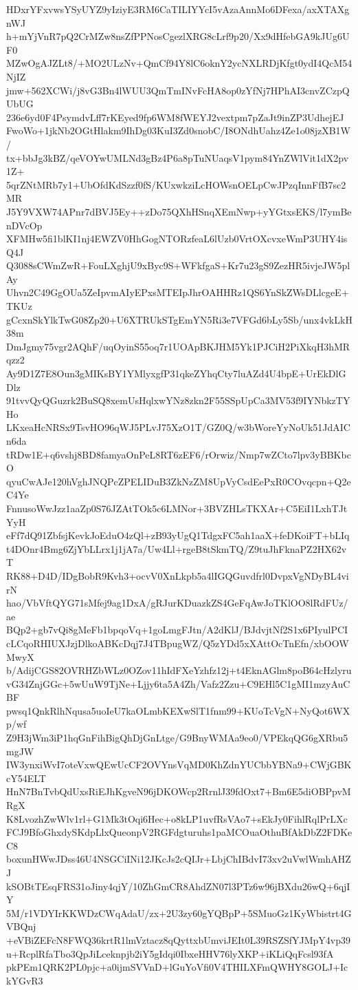 HDxrYFxvwsYSyUYZ9yIziyE3RM6CaTILIYYcI5vAzaAnnMo6DFexa/axXTAXgnWJ
h+mYjVnR7pQ2CrMZw8nsZfPPNosCgezlXRG8cLrf9p20/Xx9dHfebGA9kJUg6UF0
MZwOgAJZLt8/+MO2ULzNv+QmCf94Y8lC6oknY2ycNXLRDjKfgt0ydI4QcM54NjIZ
jmw+562XCWi/j8vG3Bn4lWUU3QmTmINvFcHA8op0zYfNj7HPhAI3cnvZCzpQUbUG
236e6yd0F4PsymdvLff7rKEyed9fp6WM8fWEYJ2vextpm7pZaJt9inZP3UdhejEJ
FwoWo+1jkNb2OGtHlakm9IhDg03KuI3Zd0snobC/I8ONdhUahz4Ze1o08jzXB1W/
tx+bbJg3kBZ/qeVOYwUMLNd3gBz4P6a8pTuNUaqsV1pym84YnZWlVit1dX2pv1Z+
5qrZNtMRb7y1+UbOfdKdSzzf0fS/KUxwkziLcHOWsnOELpCwJPzqInnFfB7sc2MR
J5Y9VXW74APnr7dBVJ5Ey++zDo75QXhHSnqXEmNwp+yYGtxsEKS/l7ymBenDVcOp
XFMHw5fi1blKI1nj4EWZV0HhGogNTORzfeaL6lUzb0VrtOXcvxeWmP3UHY4isQ4J
Q3088sCWmZwR+FouLXghjU9xByc9S+WFkfgaS+Kr7u23gS9ZezHR5ivjeJW5plAy
Uhvn2C49GgOUa5ZeIpvmAIyEPxsMTEIpJhrOAHHRz1QS6YnSkZWsDLlcgeE+TKUz
gCcxnSkYlkTwG08Zp20+U6XTRUkSTgEmYN5Ri3e7VFGd6bLy5Sb/unx4vkLkH38m
DmJgmy75vgr2AQhF/uqOyinS55oq7r1UOApBKJHM5Yk1PJCiH2PiXkqH3hMRqzz2
Ay9D1Z7E8Oun3gMIKsBY1YMlyxgfP31qkeZYhqCty7luAZd4U4bpE+UrEkDlGDlz
91tvvQyQGuzrk2BuSQ8xemUsHqlxwYNz8zkn2F55SSpUpCa3MV53f9IYNbkzTYHo
LKxeaHcNRSx9TsvHO96qWJ5PLvJ75XzO1T/GZ0Q/w3bWoreYyNoUk51JdAICn6da
tRDw1E+q6vshj8BD8famyaOnPeL8RT6zEF6/rOrwiz/Nmp7wZCto7lpv3yBBKbcO
qyuCwAJe120hVghJNQPcZPELIDuB3ZkNzZM8UpVyCsdEePxR0COvqcpn+Q2eC4Ye
FnnusoWwJzz1aaZp0S76JZAtTOk5c6LMNor+3BVZHLsTKXAr+C5EiI1LxhTJtYyH
eFf7dQ91ZbfsjKevkJoEduO4zQl+zB93yUgQ1TdgxFC5ah1aaX+feDKoiFT+bLIq
t4DOnr4Bmg6ZjYbLLrx1j1jA7a/Uw4Ll+rgeB8tSkmTQ/Z9tuJhFknaPZ2HX62vT
RK88+D4D/IDgBobR9Kvh3+ocvV0XnLkpb5a4lIGQGuvdfrl0DvpxVgNDyBL4virN
hao/VbVftQYG71sMfej9ag1DxA/gRJurKDuazkZS4GeFqAwJoTKlOO8lRdFUz/ae
BQp2+gb7vQi8gMeFb1bpqoVq+1goLmgFJtn/A2dKlJ/BJdvjtNf2S1x6PIyulPCI
cLCqoRHIUXJzjDlkoABKcDqj7J4TBpugWZ/Q5zYDd5xXAttOcTnEfn/xbOOWMwyX
b/AdijCGS82OVRHZbWLz0OZov11hIdFXeYzhfz12j+t4EknAGlm8poB64cHzlyru
vG34ZnjGGc+5wUuW9TjNe+Ljjy6ta5A4Zh/Vafz2Zzu+C9EHl5C1gMI1mzyAuCBF
pwsq1QnkRlhNqusa5uoIeU7kaOLmbKEXwSlT1fnm99+KUoTcVgN+NyQot6WXp/wf
Z9H3jWm3iP1hqGnFihBigQhDjGnLtge/G9BnyWMAa9eo0/VPEkqQG6gXRbu5mgJW
IW3ynxiWvI7oteVxwQEwUcCF2OVYnsVqMD0KhZdnYUCbbYBNa9+CWjGBKcY54ELT
HnN7BnTvbQdUxsRiEJhKgveN96jDKOWcp2RrnlJ39fdOxt7+Bm6E5diOBPpvMRgX
K8LvozhZwWlv1rl+G1Mk3tOqi6Hec+o8kLP1uvfRsVAo7+sEkJy0FihlRqlPrLXc
FCJ9BfoGhxdySKdpLlxQueonpV2RGFdgturuhs1paMCOuaOthuBfAkDbZ2FDKeC8
boxunHWwJDss46U4NSGCiINi12JKcJs2cQIJr+LbjChIBdvI73xv2uVwlWmhAHZJ
kSOBtTEsqFRS31oJiny4qjY/10ZhGmCR8AhdZN07l3PTz6w96jBXdu26wQ+6qjIY
5M/r1VDYIrKKWDzCWqAdaU/zx+2U3zy60gYQBpP+5SMuoGz1KyWbistrt4GVBQnj
+eVBiZEFcN8FWQ36krtR1lmVztacz8qQyttxbUmviJEIt0L39RSZSfYJMpY4vp39
u+RcplRfaTbo3QpJiLceknpjb2iY5gIdqi0IbxeHHV76lyXKP+iKLiQqFcsl93fA
pkPEm1QRK2PL0pjc+a0ijmSVVnD+lGuYoVfi0V4THILXFmQWHY8GOLJ+IckYGvR3
